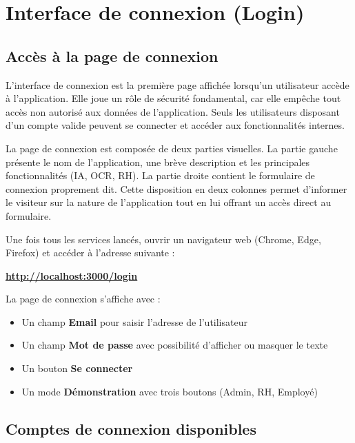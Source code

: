 \documentclass[12pt,a4paper]{report}
\begin{document}
\chapter{Interface de connexion (Login)}

\section{Accès à la page de connexion}

L'interface de connexion est la première page affichée lorsqu'un utilisateur accède à l'application. Elle joue un rôle de sécurité fondamental, car elle empêche tout accès non autorisé aux données de l'application. Seuls les utilisateurs disposant d'un compte valide peuvent se connecter et accéder aux fonctionnalités internes.

La page de connexion est composée de deux parties visuelles. La partie gauche présente le nom de l'application, une brève description et les principales fonctionnalités (IA, OCR, RH). La partie droite contient le formulaire de connexion proprement dit. Cette disposition en deux colonnes permet d'informer le visiteur sur la nature de l'application tout en lui offrant un accès direct au formulaire.

Une fois tous les services lancés, ouvrir un navigateur web (Chrome, Edge, Firefox) et accéder à l'adresse suivante :

\begin{center}
\large\textbf{\url{http://localhost:3000/login}}
\end{center}

La page de connexion s'affiche avec :
\begin{itemize}
    \item Un champ \textbf{Email} pour saisir l'adresse de l'utilisateur
    \item Un champ \textbf{Mot de passe} avec possibilité d'afficher ou masquer le texte
    \item Un bouton \textbf{Se connecter}
    \item Un mode \textbf{Démonstration} avec trois boutons (Admin, RH, Employé)
\end{itemize}

\section{Comptes de connexion disponibles}
\end{document}
